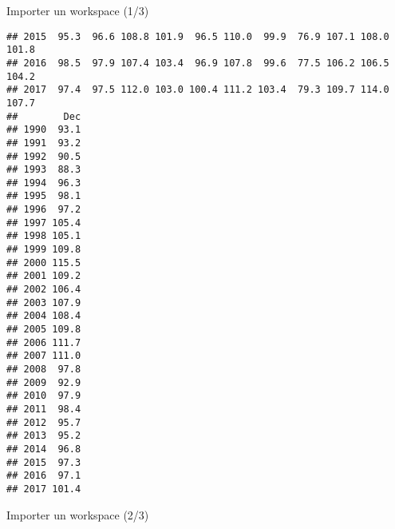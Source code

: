 \documentclass[10pt,xcolor=table,color={dvipsnames,usenames},ignorenonframetext,usepdftitle=false,french]{beamer}
\begin{document}
\begin{frame}[fragile]{Importer un workspace (1/3)}
\begin{verbatim}
## 2015  95.3  96.6 108.8 101.9  96.5 110.0  99.9  76.9 107.1 108.0 101.8
## 2016  98.5  97.9 107.4 103.4  96.9 107.8  99.6  77.5 106.2 106.5 104.2
## 2017  97.4  97.5 112.0 103.0 100.4 111.2 103.4  79.3 109.7 114.0 107.7
##        Dec
## 1990  93.1
## 1991  93.2
## 1992  90.5
## 1993  88.3
## 1994  96.3
## 1995  98.1
## 1996  97.2
## 1997 105.4
## 1998 105.1
## 1999 109.8
## 2000 115.5
## 2001 109.2
## 2002 106.4
## 2003 107.9
## 2004 108.4
## 2005 109.8
## 2006 111.7
## 2007 111.0
## 2008  97.8
## 2009  92.9
## 2010  97.9
## 2011  98.4
## 2012  95.7
## 2013  95.2
## 2014  96.8
## 2015  97.3
## 2016  97.1
## 2017 101.4
\end{verbatim}

\end{frame}

\begin{frame}{Importer un workspace (2/3)}
\protect\hypertarget{importer-un-workspace-23}{}


\end{frame}
\end{document}
